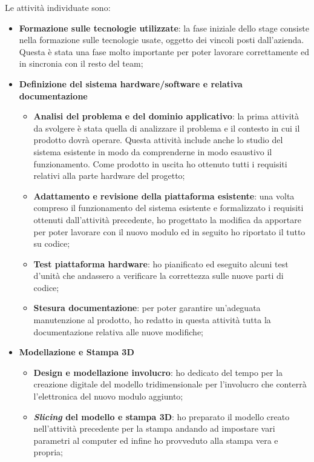 Le attività individuate sono:
\begin{itemize}
\item \textbf{Formazione sulle tecnologie utilizzate}: la fase iniziale dello stage consiste nella formazione sulle tecnologie usate, oggetto dei vincoli posti dall'azienda. Questa è stata una fase molto importante per poter lavorare correttamente ed in sincronia con il resto del team;

\item \textbf{Definizione del sistema hardware/software e relativa documentazione}
\begin{itemize}
	\item \textbf{Analisi del problema e del dominio applicativo}: la prima attività da svolgere è stata quella di analizzare il problema e il contesto in cui il prodotto dovrà operare. Questa attività include anche lo studio del sistema esistente in modo da comprenderne in modo esaustivo il funzionamento. Come prodotto in uscita ho ottenuto tutti i requisiti relativi alla parte hardware del progetto;
	\item \textbf{Adattamento e revisione della piattaforma esistente}: una volta compreso il funzionamento del sistema esistente e formalizzato i requisiti ottenuti dall'attività precedente, ho progettato la modifica da apportare per poter lavorare con il nuovo modulo ed in seguito ho riportato il tutto su codice;
	\item \textbf{Test piattaforma hardware}: ho pianificato ed eseguito alcuni test d'unità che andassero a verificare la correttezza sulle nuove parti di codice;
	\item \textbf{Stesura documentazione}: per poter garantire un'adeguata manutenzione al prodotto, ho redatto in questa attività tutta la documentazione relativa alle nuove modifiche;
\end{itemize}

\item \textbf{Modellazione e Stampa 3D}
\begin{itemize}
	\item \textbf{Design e modellazione involucro}: ho dedicato del tempo per la creazione digitale del modello tridimensionale per l'involucro che conterrà l'elettronica del nuovo modulo aggiunto;
	\item \textbf{\textit{Slicing} del modello e stampa 3D}: ho preparato il modello creato nell'attività precedente per la stampa andando ad impostare vari parametri al computer ed infine ho provveduto alla stampa vera e propria;
\end{itemize}


\end{itemize}
